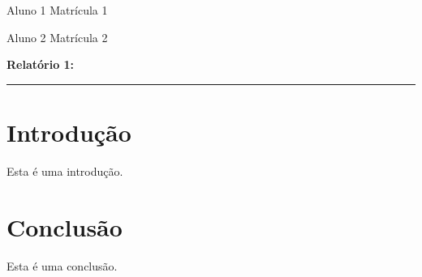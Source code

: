 \documentclass[11pt]{article}
\begin{document}
\noindent Aluno 1 \hfill Matrícula 1

\noindent Aluno 2 \hfill Matrícula 2

\noindent \textbf{Relatório 1: }

\noindent \rule{\linewidth}{1.5pt}

\section{Introdução}

Esta é uma introdução.

\section{Conclusão}

Esta é uma conclusão.
\end{document}
